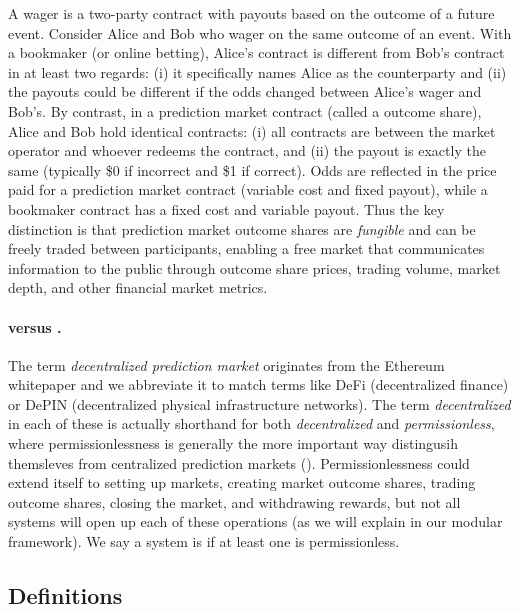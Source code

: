 A wager is a two-party contract with payouts based on the outcome of a future event. Consider Alice and Bob who wager on the same outcome of an event. With a bookmaker (or online betting), Alice's contract is different from Bob's contract in at least two regards: (i) it specifically names Alice as the counterparty and (ii) the payouts could be different if the odds changed between Alice's wager and Bob's. By contrast, in a prediction market contract (called a outcome share), Alice and Bob hold identical contracts: (i) all contracts are between the market operator and whoever redeems the contract, and (ii) the payout is exactly the same (typically \$0 if incorrect and \$1 if correct). Odds are reflected in the price paid for a prediction market contract (\ie variable cost and fixed payout), while a bookmaker contract has a fixed cost and variable payout. Thus the key distinction is that prediction market outcome shares are \textit{fungible} and can be freely traded between participants, enabling a free market that communicates information to the public through outcome share prices, trading volume, market depth, and other financial market metrics. 

\paragraph{\cepm versus \depm.}

The term \textit{decentralized prediction market} originates from the Ethereum whitepaper and we abbreviate it \depm to match terms like DeFi (decentralized finance) or DePIN (decentralized physical infrastructure networks). The term \textit{decentralized} in each of these is actually shorthand for both \textit{decentralized} and \textit{permissionless}, where permissionlessness is generally the more important way \depms distingusih themsleves from centralized prediction markets (\cepms). Permissionlessness could extend itself to setting up markets, creating market outcome shares, trading outcome shares, closing the market, and withdrawing rewards, but not all systems will open up each of these operations (as we will explain in our modular framework). We say a system is \depm if at least one is permissionless.


\subsection{Definitions}
\label{sec:defn}

